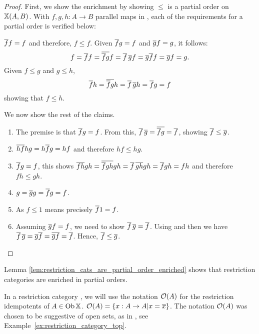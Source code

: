 \begin{proof}
  First, we show the enrichment by showing $\le$ is a partial order on $\mathbb{X}(A,B)$. With
  $f,g,h:A\to  B$ parallel maps in \X, each of the requirements for a partial order is
  verified below:
  \begin{description}
     $\overline{f} f = f$ and therefore, $ f \le f$.
     Given $\overline{f}g = f$ and $\overline{g}f = g$, it follows:
    \[
      f = \overline{f} f = \overline{\overline{f} g} f = \overline{f}\, \overline{g} f
      = \overline{g}\overline{f} f =  \overline{g} f = g.
    \]
     Given $f \le g$ and $g\le h$,
      \[
        \overline{f} h = \overline{\overline{f} g} h = \overline{f}\, \overline{g} h = \overline{f} g = f
      \]
    showing that $f \le h$.
  \end{description}

  We now show the rest of the claims.
  \begin{enumerate}[{(}i{)}]
    \item The premise is that $\overline{f} g = f$. From this, $ \overline{f}\, \overline{g} =
      \overline{\overline{f} g} = \overline{f}$, showing $\overline{f} \le \overline{g}$.
    \item $\overline{h f} h g = h \overline{f} g = h f$  and therefore $h f \le h g$.
    \item $\overline{f} g = f$, this shows $\overline{f h} g h = \overline{\overline{f} g h} g h
      = \overline{f}\, \overline{g h} g h = \overline{f} g h = f h$ and therefore $f h \le g h$.
    \item $g = \overline{g} g = \overline{f} g = f$.
    \item As $f \le 1$ means precisely $\overline{f}1 = f$.
    \item Assuming $\overline{g} f = f$, we need to show $\overline{f}\, \overline{g} = \overline{f}$. Using \rtwo and
      then \rthree we have $\overline{f}\,\overline{g} = \overline{g}\overline{f}  = \overline{\overline{g} f}  = \overline{f}$.
      Hence, $\overline{f} \le \overline{g}$.
  \end{enumerate}
\end{proof}

Lemma \ref{lem:restriction_cats_are_partial_order_enriched} shows that restriction
categories are enriched in partial orders.

In a restriction category \X, we will use the notation $\mathcal{O}({A})$ for the restriction idempotents
of $A\in \operatorname{Ob}{\mathbb{X}}$. $\mathcal{O}({A}) = \{x:A\to A| x = \overline{x}\}$. The notation $\mathcal{O}({A})$ was chosen
to be suggestive of open sets, as in \topcatp, see Example~\ref{ex:restriction_category_top}.


